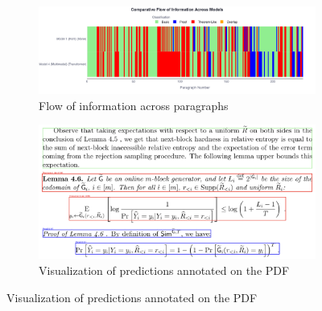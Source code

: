 \documentclass[runningheads]{llncs}
\begin{document}
\begin{figure}
	\centering
	\begin{subfigure}[b]{0.48\textwidth}
		\centering
		\includegraphics[width=\textwidth]{images/comparitive-v3.png}
		\caption{Flow of information across paragraphs}
	\end{subfigure}
	\hfill
	\begin{subfigure}[b]{0.48\textwidth}
		\centering
		\includegraphics[width=\textwidth]{images/vis_on_pdf.png}
		\caption{Visualization of predictions annotated on the PDF}
	\end{subfigure}

	\vspace{0.5cm}


\end{figure}
\end{document}
